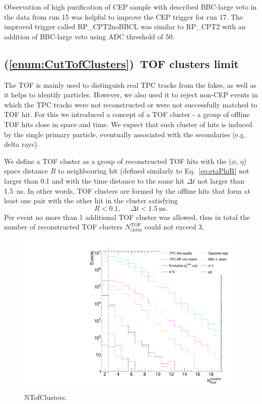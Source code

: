 Observation of high purification of CEP sample with described BBC-large veto in the data from run 15 was helpful to improve the CEP trigger for run 17. The improved trigger called RP\_CPT2noBBCL was similar to RP\_CPT2 with an addition of BBC-large veto using ADC threshold of 50.




\subsection{(\ref{enum:CutTofClusters})~TOF clusters limit}

The TOF is mainly used to distinguish real TPC tracks from the fakes, as well as it helps to identify particles. However, we also used it to reject non-CEP events in which the TPC tracks were not reconstructed or were not successfully matched to TOF hit. For this we introduced a concept of a TOF cluster - a group of offline TOF hits close in space and time. We expect that such cluster of hits is induced by the single primary particle, eventually associated with the secondaries (e.g. delta rays).

We define a TOF cluster as a group of reconstructed TOF hits with the ($\phi$, $\eta$) space distance $R$ to neighbouring hit (defined similarly to Eq.~\eqref{eq:etaPhiR} not larger than 0.1 and with the time distance to the same hit $\Delta t$ not larger than 1.5~ns. In other words, TOF clusters are formed by the offline hits that form at least one pair with the other hit in the cluster satisfying
\begin{equation}
 R<0.1,~~~~~~\Delta t<1.5~\text{ns}.
\end{equation}
Per event no more than 1 additional TOF cluster was allowed, thus in total the number of reconstructed TOF clusters $N^{\text{TOF}}_{\text{clstrs}}$ could not exceed 3.

\begin{figure}[ht!]
\centering%
\includegraphics[width=0.475\linewidth,page=1]{graphics/eventSelection/NTofClusters.pdf}%
\caption{NTofClusters.}\label{fig:NTofClusters}%
\end{figure}

